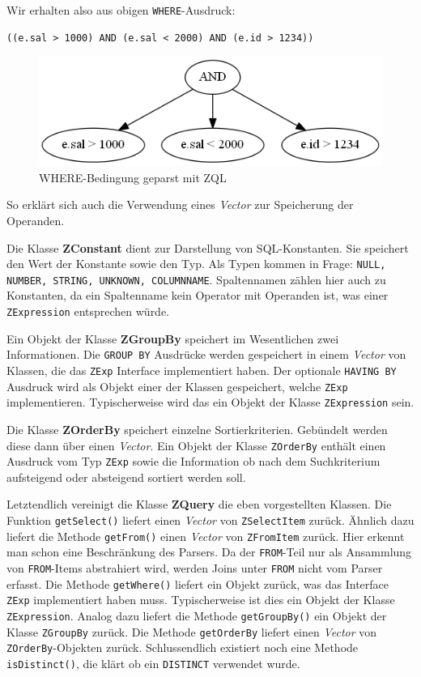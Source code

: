 Wir erhalten also aus obigen \verb|WHERE|-Ausdruck:
\begin{verbatim}
((e.sal > 1000) AND (e.sal < 2000) AND (e.id > 1234))
\end{verbatim}

\begin{figure}
\includegraphics[scale=0.7]{Bilder/with_zql.png}
\caption{WHERE-Bedingung geparst mit ZQL}
\end{figure}

So erklärt sich auch die Verwendung eines \textit{Vector} zur Speicherung der Operanden.

Die Klasse \textbf{ZConstant} dient zur Darstellung von SQL-Konstanten. Sie speichert den Wert der Konstante sowie den Typ. Als Typen kommen in Frage: \verb|NULL, NUMBER, STRING, UNKNOWN, COLUMNNAME|. Spaltennamen zählen hier auch zu Konstanten, da ein Spaltenname kein Operator mit Operanden ist, was einer \verb|ZExpression| entsprechen würde.

Ein Objekt der Klasse \textbf{ZGroupBy} speichert im Wesentlichen zwei Informationen. Die \verb|GROUP BY| Ausdrücke werden gespeichert in einem \textit{Vector} von Klassen, die das \verb|ZExp| Interface implementiert haben. Der optionale \verb|HAVING BY| Ausdruck wird als Objekt einer der Klassen gespeichert, welche \verb|ZExp| implementieren. Typischerweise wird das ein Objekt der Klasse \verb|ZExpression| sein.

Die Klasse \textbf{ZOrderBy} speichert einzelne Sortierkriterien. Gebündelt werden diese dann über einen \textit{Vector}. Ein Objekt der Klasse \verb|ZOrderBy| enthält einen Ausdruck vom Typ \verb|ZExp| sowie die Information ob nach dem Suchkriterium aufsteigend oder absteigend sortiert werden soll.

Letztendlich vereinigt die Klasse \textbf{ZQuery} die eben vorgestellten Klassen. Die Funktion \verb|getSelect()| liefert einen \textit{Vector} von \verb|ZSelectItem| zurück. Ähnlich dazu liefert die Methode \verb|getFrom()| einen \textit{Vector} von \verb|ZFromItem| zurück. Hier erkennt man schon eine Beschränkung des Parsers. Da der \verb|FROM|-Teil nur als Ansammlung von \verb|FROM|-Items abstrahiert wird, werden Joins unter \verb|FROM| nicht vom Parser erfasst. Die Methode \verb|getWhere()| liefert ein Objekt zurück, was das Interface \verb|ZExp| implementiert haben muss. Typischerweise ist dies ein Objekt der Klasse \verb|ZExpression|. Analog dazu liefert die Methode \verb|getGroupBy()| ein Objekt der Klasse \verb|ZGroupBy| zurück. Die Methode \verb|getOrderBy| liefert einen \textit{Vector} von \verb|ZOrderBy|-Objekten zurück.
Schlussendlich existiert noch eine Methode \verb|isDistinct()|, die klärt ob ein \verb|DISTINCT| verwendet wurde.

